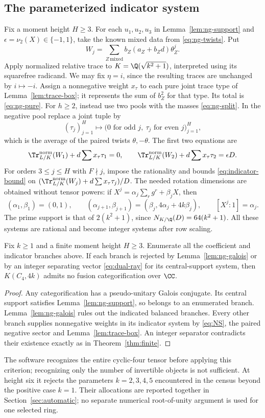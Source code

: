 \subsection{The parameterized indicator system}
Fix a moment height $H\ge3$. For each $u_1,u_2,u_3$ in Lemma~\ref{lem:ng-support} and
$\epsilon=\nu_2(X)\in\{-1,1\}$, take the known mixed data from
\eqref{eq:ng-twists}. Put
\[
 W_j=\sum_{Z\,\mathrm{mixed}} b_Z(a_Z+b_Zd)\theta_Z^j.
\]
Apply normalized relative trace to $K=\Q(\sqrt{k^2+1})$, interpreted
using its squarefree radicand. We may fix $\eta=i$, since the resulting
traces are unchanged by $i\mapsto-i$. Assign a nonnegative weight
$x_\tau$ to each pure joint trace type of Lemma~\ref{lem:trace-box}; it
represents the sum of $b_Z^2$ for that type. Its total is
\eqref{eq:ng-pure}. For $h\ge2$, instead use two pools with the masses
\eqref{eq:ng-split}. In the negative pool replace a joint tuple by
\[
 (\tau_j)_{j=1}^H\longmapsto
 \bigl(0\text{ for odd }j,\ \tau_j\text{ for even }j\bigr)_{j=1}^H,
\]
which is the average of the paired twists $\theta,-\theta$.
The first two equations are
\[
 \Tr^{\mathrm{norm}}_{L/K}(W_1)+d\sum x_\tau\tau_1=0,\qquad
 \Tr^{\mathrm{norm}}_{L/K}(W_2)+d\sum x_\tau\tau_2=\epsilon D.
\]
For orders $3\le j\le H$ with $F\nmid j$, impose the rationality and
bounds \eqref{eq:indicator-bound} on
$(\Tr^{\mathrm{norm}}_{L/K}(W_j)+d\sum x_\tau\tau_j)/D$.
The needed rotation dimensions are obtained without tensor powers:
if $X^j=\alpha_j\sum_rg^r+\beta_jX$, then
\[
 (\alpha_1,\beta_1)=(0,1),\qquad
 (\alpha_{j+1},\beta_{j+1})=(\beta_j,4\alpha_j+4k\beta_j),\qquad
 [X^j:1]=\alpha_j.
\]
The prime support is that of $2(k^2+1)$, since
$N_{K/\Q}(D)=64(k^2+1)$. All these systems are rational and become
integer systems after row scaling.

\begin{theorem}\label{thm:cyclic}
Fix $k\ge1$ and a finite moment height $H\ge3$. Enumerate all the
coefficient and indicator branches above. If each branch is rejected by
Lemma~\ref{lem:ng-galois} or by an integer separating vector
\eqref{eq:dual-ray} for its central-support system, then $K(C_4,4k)$
admits no fusion categorification over $\CC$.
\end{theorem}
\begin{proof}
Any categorification has a pseudo-unitary Galois conjugate. Its central
support satisfies Lemma~\ref{lem:ng-support}, so belongs to an enumerated
branch. Lemma~\ref{lem:ng-galois} rules out the indicated balanced
branches. Every other branch supplies nonnegative weights in its
indicator system by \eqref{eq:NS}, the paired negative sector and
Lemma~\ref{lem:trace-box}. An integer separator contradicts their
existence exactly as in Theorem~\ref{thm:finite}.
\end{proof}

The software recognizes the entire cyclic-four tensor before applying
this criterion; recognizing only the number of invertible objects is
not sufficient. At height six it rejects the parameters $k=2,3,4,5$
encountered in the census beyond the positive case $k=1$. Their allocations are
reported together in Section~\ref{sec:automatic}; no separate numerical
root-of-unity argument is used for one selected ring.
